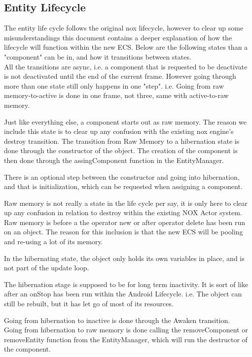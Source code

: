 \subsection{Entity Lifecycle}
The entity life cycle follows the original nox lifecycle,
however to clear up some misunderstandings this document contains a deeper explanation of how the lifecycle will function within the new ECS.
Below are the following states than a "component" can be in, and how it transitions between states.\\
All the transitions are async, i.e. a component that is requested to be deactivate is not deactivated until the end of the current frame.
However going through more than one state still only happens in one "step".
i.e. Going from raw memory-to-active is done in one frame, not three, same with active-to-raw memory.

Just like everything else, a component starts out as raw memory. 
The reason we include this state is to clear up any confusion with the existing nox engine's destroy transition. 
The transition from Raw Memory to a hibernation state is done through the constructor of the object. The creation of the component is then done through the assingComponent function in the EntityManager.

There is an optional step between the constructor and going into hibernation, and that is initialization, which can be requested when assigning a component.

Raw memory is not really a state in the life cycle per say, it is only here to clear up any confusion in relation to destroy within the existing NOX Actor system. 
Raw memory is before a the operator new or after operator delete has been run on an object.
The reason for this inclusion is that the new ECS will be pooling and re-using a lot of its memory.

In the hibernating state, the object only holds its own variables in place, and is not part of the update loop.

The hibernation stage is supposed to be for long term inactivity.
It is sort of like after an onStop has been run within the Android Lifecycle. i.e. The object can still be rebuilt, but it has let go of most of its resources.

Going from hibernation to inactive is done through the Awaken transition.\\
Going from hibernation to raw memory is done calling the removeComponent or removeEntity function from the EntityManager, 
which will run the destructor of the component.

